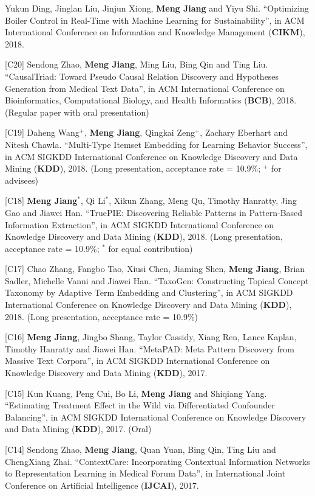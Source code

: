 \documentclass[margin, 9pt]{res}
\begin{document}
\begin{resume}
[C21] Yukun Ding, Jinglan Liu, Jinjun Xiong, \textbf{Meng Jiang} and Yiyu Shi. ``Optimizing Boiler Control in Real-Time with Machine Learning for Sustainability'', in ACM International Conference on Information and Knowledge Management (\textbf{CIKM}), 2018.

[C20] Sendong Zhao, \textbf{Meng Jiang}, Ming Liu, Bing Qin and Ting Liu. ``CausalTriad: Toward Pseudo Causal Relation Discovery and Hypotheses Generation from Medical Text Data'', in ACM International Conference on Bioinformatics, Computational Biology, and Health Informatics (\textbf{BCB}), 2018. (Regular paper with oral presentation)

[C19] Daheng Wang${}^{+}$, \textbf{Meng Jiang}, Qingkai Zeng${}^{+}$, Zachary Eberhart and Nitesh Chawla. ``Multi-Type Itemset Embedding for Learning Behavior Success'', in ACM SIGKDD International Conference on Knowledge Discovery and Data Mining (\textbf{KDD}), 2018. (Long presentation, acceptance rate = 10.9\%; ${}^{+}$ for advisees)

[C18] \textbf{Meng Jiang}${}^{*}$, Qi Li${}^{*}$, Xikun Zhang, Meng Qu, Timothy Hanratty, Jing Gao and Jiawei Han. ``TruePIE: Discovering Reliable Patterns in Pattern-Based Information Extraction'', in ACM SIGKDD International Conference on Knowledge Discovery and Data Mining (\textbf{KDD}), 2018. (Long presentation, acceptance rate = 10.9\%; ${}^{*}$ for equal contribution)

[C17] Chao Zhang, Fangbo Tao, Xiusi Chen, Jiaming Shen, \textbf{Meng Jiang}, Brian Sadler, Michelle Vanni and Jiawei Han. ``TaxoGen: Constructing Topical Concept Taxonomy by Adaptive Term Embedding and Clustering'', in ACM SIGKDD International Conference on Knowledge Discovery and Data Mining (\textbf{KDD}), 2018. (Long presentation, acceptance rate = 10.9\%)

[C16] \textbf{Meng Jiang}, Jingbo Shang, Taylor Cassidy, Xiang Ren, Lance Kaplan, Timothy Hanratty and Jiawei Han. ``MetaPAD: Meta Pattern Discovery from Massive Text Corpora'', in ACM SIGKDD International Conference on Knowledge Discovery and Data Mining (\textbf{KDD}), 2017.

[C15] Kun Kuang, Peng Cui, Bo Li, \textbf{Meng Jiang} and Shiqiang Yang. ``Estimating Treatment Effect in the Wild via Differentiated Confounder Balancing'', in ACM SIGKDD International Conference on Knowledge Discovery and Data Mining (\textbf{KDD}), 2017. (Oral)

[C14] Sendong Zhao, \textbf{Meng Jiang}, Quan Yuan, Bing Qin, Ting Liu and ChengXiang Zhai. ``ContextCare: Incorporating Contextual Information Networks to Representation Learning in Medical Forum Data'', in International Joint Conference on Artificial Intelligence (\textbf{IJCAI}), 2017.


\end{resume}
\end{document}
